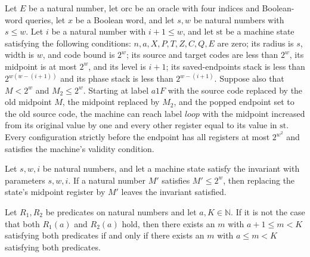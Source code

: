 \begin{theorem}
\label{Complexity.LogProg.SavitchARM.tail1F}
\leanok
{}
Let $E$ be a natural number, let $\mathrm{orc}$ be an oracle with four indices and
Boolean-word queries, let $x$ be a Boolean word, and let $s,w$ be natural numbers with
$s\le w$. Let $i$ be a natural number with $i+1\le w$, and let $\mathrm{st}$ be a
machine state satisfying the following conditions: $n,a,X,P,T,Z,C,Q,E$ are zero; its
radius is $s$, width is $w$, and code bound is $2^w$; its source and target codes are
less than $2^w$, its midpoint is at most $2^w$, and its level is $i+1$; its
saved-endpoints stack is less than $2^{w(w-(i+1))}$ and its phase stack is less than
$2^{w-(i+1)}$. Suppose also that $M<2^w$ and $M_2\le 2^w$. Starting at label $a1F$ with
the source code replaced by the old midpoint $M$, the midpoint replaced by $M_2$, and
the popped endpoint set to the old source code, the machine can reach label $loop$ with
the midpoint increased from its original value by one and every other register equal to
its value in $\mathrm{st}$. Every configuration strictly before the endpoint has all
registers at most $2^{w^2}$ and satisfies the machine's validity condition.
\end{theorem}

\begin{lemma}
\label{Complexity.LogProg.SavitchARM.Inv.setM}
\leanok
{}
Let $s,w,i$ be natural numbers, and let a machine state satisfy the invariant with
parameters $s,w,i$. If a natural number $M'$ satisfies $M'\le 2^w$, then replacing the
state's midpoint register by $M'$ leaves the invariant satisfied.
\end{lemma}

\begin{lemma}
\label{Complexity.LogProg.SavitchARM.exists_shift}
\leanok
{}
Let $R_1,R_2$ be predicates on natural numbers and let $a,K\in\mathbb{N}$. If it is not
the case that both $R_1(a)$ and $R_2(a)$ hold, then there exists an $m$ with $a+1\leq
m<K$ satisfying both predicates if and only if there exists an $m$ with $a\leq m<K$
satisfying both predicates.
\end{lemma}

